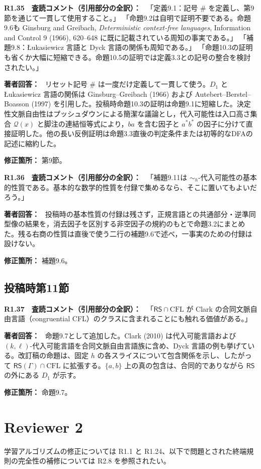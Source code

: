 \documentclass[10pt,a4paper]{ltjsarticle}
\newcommand{\Comment}[1]{\par\medskip\noindent\textbf{#1　査読コメント（引用部分の全訳）：}\ }
\newcommand{\Reply}{\par\noindent\textbf{著者回答：}\ }
\newcommand{\Location}[1]{\par\noindent\textbf{修正箇所：} #1\par}
\newcommand{\RS}{\mathsf{RS}}
\begin{document}
\Comment{R1.35}
「定義9.1：記号 $\#$ を定義し、第9節を通じて一貫して使用すること。」
「命題9.2は自明で証明不要である。命題9.6も Ginsburg and Greibach, \emph{Deterministic context-free languages}, Information and Control 9 (1966), 620--648 に既に記載されている周知の事実である。」
「補題9.8：Łukasiewicz 言語と Dyck 言語の関係も周知である。」
「命題10.3の証明も省くか大幅に短縮できる。命題10.5の証明では定義3.3との記号の整合を検討されたい。」

\Reply
リセット記号 $\#$ は一度だけ定義して一貫して使う。$D_1$ と Łukasiewicz 言語の関係は Ginsburg--Greibach (1966) および Autebert--Berstel--Boasson (1997) を引用した。投稿時命題10.3の証明は命題9.1に短縮した。決定性文脈自由性はプッシュダウンによる簡潔な議論とし，代入可能性は入口高さ集合 $\mathcal Q(x)$ と脚注の連結恒等式により，$ba$ を含む因子と $a^*b^*$ の因子に分けて直接証明した。他の長い反例証明は命題3.3直後の判定条件または初等的なDFAの記述に縮約した。
\Location{第9節。}

\Comment{R1.36}
「補題9.11は $\sim_h$-代入可能性の基本的性質である。基本的な数学的性質を付録で集めるなら、そこに置いてもよいだろう。」

\Reply
投稿時の基本性質の付録は残さず，正規言語との共通部分・逆準同型像の結果を，消去因子を区別する非空因子の規約のもとで命題3.2にまとめた。残る右商の性質は直後で使う二行の補題9.6で述べ，一事実のための付録は設けない。
\Location{補題9.6。}

\subsection*{投稿時第11節}
\Comment{R1.37}
「$\RS\cap\mathrm{CFL}$ が Clark の合同文脈自由言語（congruential CFL）のクラスに含まれることにも触れる価値がある。」

\Reply
命題9.7として追加した。Clark (2010) は代入可能言語および $(k,\ell)$-代入可能言語を合同文脈自由言語族に含め、Dyck 言語の例も挙げている。改訂稿の命題は、固定 $h$ の各スライスについて包含関係を示し、したがって $\RS(\Gamma)\cap\mathrm{CFL}$ に拡張する。$\{a,b\}$ 上の真の包含は、合同的でありながら $\RS$ の外にある $D_1$ が示す。
\Location{命題9.7。}




\section*{Reviewer 2}
学習アルゴリズムの修正については R1.1 と R1.24、以下で問題とされた終端規則の完全性の補修については R2.8 を参照されたい。
\end{document}
